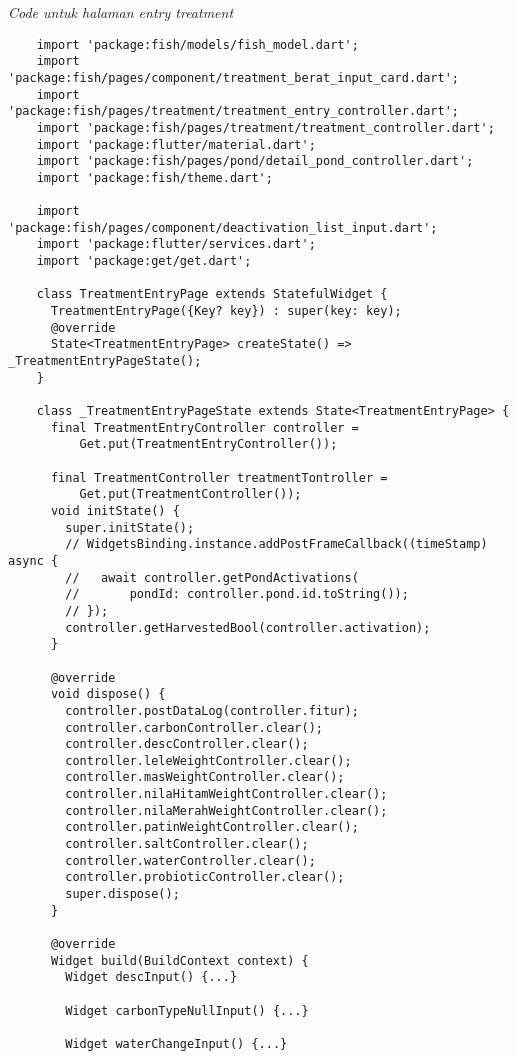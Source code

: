 	\textit{Code untuk halaman entry treatment}
	\begin{lstlisting}
    import 'package:fish/models/fish_model.dart';
    import 'package:fish/pages/component/treatment_berat_input_card.dart';
    import 'package:fish/pages/treatment/treatment_entry_controller.dart';
    import 'package:fish/pages/treatment/treatment_controller.dart';
    import 'package:flutter/material.dart';
    import 'package:fish/pages/pond/detail_pond_controller.dart';
    import 'package:fish/theme.dart';
    
    import 'package:fish/pages/component/deactivation_list_input.dart';
    import 'package:flutter/services.dart';
    import 'package:get/get.dart';
    
    class TreatmentEntryPage extends StatefulWidget {
      TreatmentEntryPage({Key? key}) : super(key: key);
      @override
      State<TreatmentEntryPage> createState() => _TreatmentEntryPageState();
    }
    
    class _TreatmentEntryPageState extends State<TreatmentEntryPage> {
      final TreatmentEntryController controller =
          Get.put(TreatmentEntryController());
    
      final TreatmentController treatmentTontroller =
          Get.put(TreatmentController());
      void initState() {
        super.initState();
        // WidgetsBinding.instance.addPostFrameCallback((timeStamp) async {
        //   await controller.getPondActivations(
        //       pondId: controller.pond.id.toString());
        // });
        controller.getHarvestedBool(controller.activation);
      }
    
      @override
      void dispose() {
        controller.postDataLog(controller.fitur);
        controller.carbonController.clear();
        controller.descController.clear();
        controller.leleWeightController.clear();
        controller.masWeightController.clear();
        controller.nilaHitamWeightController.clear();
        controller.nilaMerahWeightController.clear();
        controller.patinWeightController.clear();
        controller.saltController.clear();
        controller.waterController.clear();
        controller.probioticController.clear();
        super.dispose();
      }
    
      @override
      Widget build(BuildContext context) {
        Widget descInput() {...}
    
        Widget carbonTypeNullInput() {...}
    
        Widget waterChangeInput() {...}
    

\end{lstlisting}
